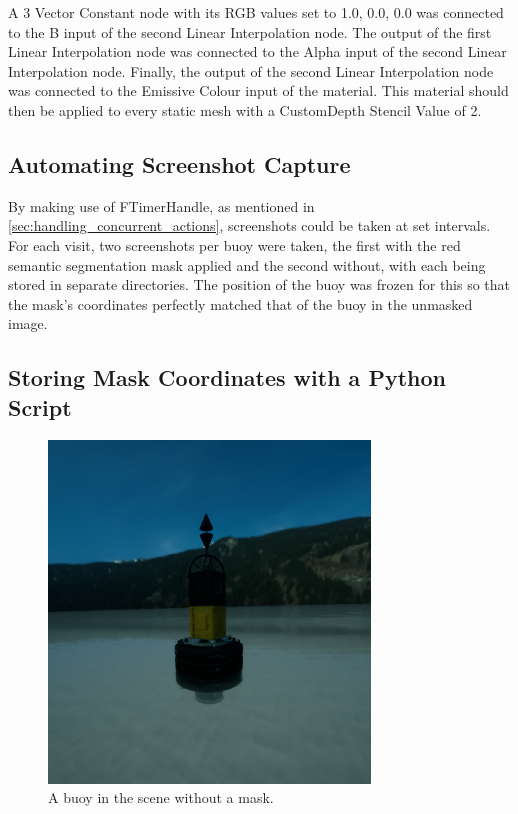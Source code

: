 \documentclass[10pt,twocolumn,letterpaper]{article}
\begin{document}
A 3 Vector Constant node with its RGB values set to 1.0, 0.0, 0.0 was connected to the B input of the second Linear Interpolation node. The output of the first Linear Interpolation node was connected to the Alpha input of the second Linear Interpolation node. Finally, the output of the second Linear Interpolation node was connected to the Emissive Colour input of the material. This material should then be applied to every static mesh with a CustomDepth Stencil Value of 2.

\subsection{Automating Screenshot Capture}

By making use of FTimerHandle, as mentioned in \ref{sec:handling_concurrent_actions}, screenshots could be taken at set intervals. For each visit, two screenshots per buoy were taken, the first with the red semantic segmentation mask applied and the second without, with each being stored in separate directories. The position of the buoy was frozen for this so that the mask's coordinates perfectly matched that of the buoy in the unmasked image.

\subsection{Storing Mask Coordinates with a Python Script} \label {sec:mask_coordinates}

\begin{figure}[t]
    \centering
    \includegraphics[width=\linewidth]{images/buoy_without_mask.png}
    \caption{A buoy in the scene without a mask.}
    \label{fig:buoy_without_mask}
\end{figure}
\end{document}

